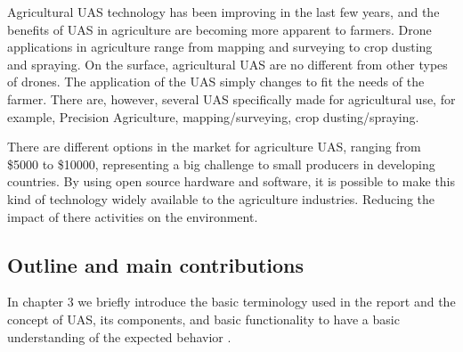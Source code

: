 
Agricultural UAS technology has been improving in the last few years, and the benefits of UAS in agriculture are becoming more apparent to farmers. Drone applications in agriculture range from mapping and surveying to crop dusting and spraying. On the surface, agricultural UAS are no different from other types of drones. The application of the UAS simply changes to fit the needs of the farmer. There are, however, several UAS specifically made for agricultural use, for example, Precision Agriculture, mapping/surveying, crop dusting/spraying. 

There are different options in the market for agriculture UAS, ranging from \$5000 to \$10000, representing a big challenge to small producers in developing countries. By using open source hardware and software, it is possible to make this kind of technology widely available to the agriculture industries. Reducing the impact of there activities on the environment.

\subsection{Outline and main contributions}
In chapter 3 we briefly introduce the basic terminology used in the report and the concept of UAS, its components, and basic functionality to have a basic understanding of the expected behavior . 